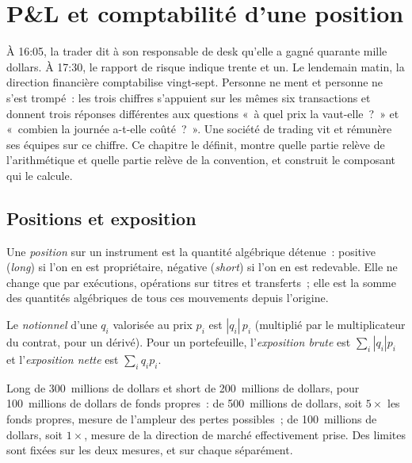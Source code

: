 \chapter{P\&L et comptabilité d'une position}\label{ch:m1:pnl-and-positions}

À 16:05, la trader dit à son responsable de desk qu'elle a gagné quarante mille dollars. À
17:30, le rapport de risque indique trente et un. Le lendemain matin, la direction
financière comptabilise vingt-sept. Personne ne ment et personne ne s'est trompé~:
les trois chiffres s'appuient sur les mêmes six transactions et donnent trois réponses
différentes aux questions «~à quel prix la  vaut-elle~?~» et «~combien la journée
a-t-elle coûté~?~». Une société de trading vit et rémunère ses équipes sur ce chiffre. Ce
chapitre le définit, montre quelle partie relève de l'arithmétique et quelle partie
relève de la convention, et construit le composant qui le calcule.

\section{Positions et exposition}

\begin{definition}[Position]\label{def:m1:pnl-and-positions:position}
Une \emph{position} sur un instrument est la quantité algébrique
détenue~: positive (\emph{long}) si l'on en est propriétaire, négative (\emph{short}) si l'on en est redevable. Elle
ne change que par exécutions, opérations sur titres et transferts~; elle est la somme
des quantités algébriques de tous ces mouvements depuis l'origine.
\end{definition}

\begin{definition}\label{def:m1:pnl-and-positions:exposure}
Le \emph{notionnel} d'une  $q_i$ valorisée au prix $p_i$
est $|q_i|\,p_i$ (multiplié par le multiplicateur du contrat, pour un dérivé). Pour un
portefeuille, l'\emph{exposition brute} est $\sum_i |q_i| p_i$
et l'\emph{exposition nette} est $\sum_i q_i p_i$.
\end{definition}

\begin{example}\label{ex:m1:pnl-and-positions:book}
Long de 300~millions de dollars et short de 200~millions de dollars, pour 100~millions de dollars de fonds propres~:
 de 500~millions de dollars, soit $5\times$ les fonds propres, mesure de l'ampleur des pertes possibles~;
 de 100~millions de dollars, soit $1\times$, mesure de la direction de marché
effectivement prise. Des limites sont fixées sur les deux mesures, et sur chaque  séparément.
\end{example}

